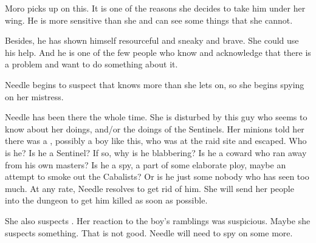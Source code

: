 Moro picks up on this. 
It is one of the reasons she decides to take him under her wing. 
He is more sensitive than she and can see some things that she cannot. 

Besides, he has shown himself resourceful and sneaky and brave. 
She could use his help. 
And he is one of the few people who know and acknowledge that there is a problem and want to do something about it. 





\begin{comment}
  \section{Needle thinks}
\end{comment}
\new
Needle begins to suspect that \Tiroco{} knows more than she lets on, so she begins spying on her mistress. 

Needle has been there the whole time. 
She is disturbed by this guy who seems to know about her doings, and/or the doings of the Sentinels. 
Her minions told her there was a \human, possibly a boy like this, who was at the raid site and escaped. 
Who is he?
Is he a Sentinel? 
If so, why is he blabbering? 
Is he a coward who ran away from his own masters?
Is he a spy, a part of some elaborate ploy, maybe an attempt to smoke out the Cabalists?
Or is he just some nobody who has seen too much. 
At any rate, Needle resolves to get rid of him. 
She will send her people into the dungeon to get him killed as soon as possible. 

She also suspects \Tiroco. 
Her reaction to the boy's ramblings was suspicious. 
Maybe she suspects something. 
That is not good. 
Needle will need to spy on \Tiroco some more. 









